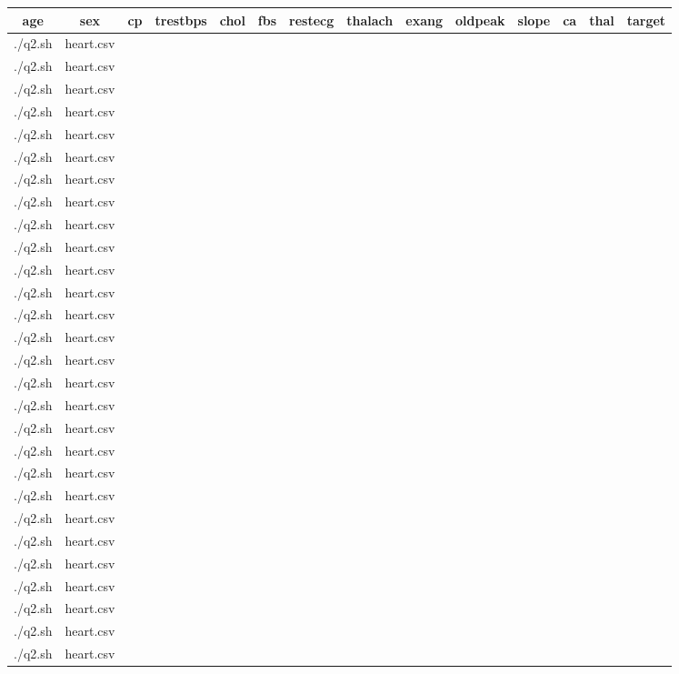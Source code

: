 \documentclass{article}
\begin{document}
\begin{table}[h!]
\centering
\begin{tabular}{|c|c|c|c|c|c|c|c|c|c|c|c|c|c|}
\hline
\textbf{age} & \textbf{sex} & \textbf{cp} & \textbf{trestbps} & \textbf{chol} & \textbf{fbs} & \textbf{restecg} & \textbf{thalach} & \textbf{exang} & \textbf{oldpeak} & \textbf{slope} & \textbf{ca} & \textbf{thal} & \textbf{target} \\ \hline./q2.sh & heart.csv &  &  &  &  &  &  &  &  &  &  &  &  \\ \hline./q2.sh & heart.csv &  &  &  &  &  &  &  &  &  &  &  &  \\ \hline./q2.sh & heart.csv &  &  &  &  &  &  &  &  &  &  &  &  \\ \hline./q2.sh & heart.csv &  &  &  &  &  &  &  &  &  &  &  &  \\ \hline./q2.sh & heart.csv &  &  &  &  &  &  &  &  &  &  &  &  \\ \hline./q2.sh & heart.csv &  &  &  &  &  &  &  &  &  &  &  &  \\ \hline./q2.sh & heart.csv &  &  &  &  &  &  &  &  &  &  &  &  \\ \hline./q2.sh & heart.csv &  &  &  &  &  &  &  &  &  &  &  &  \\ \hline./q2.sh & heart.csv &  &  &  &  &  &  &  &  &  &  &  &  \\ \hline./q2.sh & heart.csv &  &  &  &  &  &  &  &  &  &  &  &  \\ \hline./q2.sh & heart.csv &  &  &  &  &  &  &  &  &  &  &  &  \\ \hline./q2.sh & heart.csv &  &  &  &  &  &  &  &  &  &  &  &  \\ \hline./q2.sh & heart.csv &  &  &  &  &  &  &  &  &  &  &  &  \\ \hline./q2.sh & heart.csv &  &  &  &  &  &  &  &  &  &  &  &  \\ \hline./q2.sh & heart.csv &  &  &  &  &  &  &  &  &  &  &  &  \\ \hline./q2.sh & heart.csv &  &  &  &  &  &  &  &  &  &  &  &  \\ \hline./q2.sh & heart.csv &  &  &  &  &  &  &  &  &  &  &  &  \\ \hline./q2.sh & heart.csv &  &  &  &  &  &  &  &  &  &  &  &  \\ \hline./q2.sh & heart.csv &  &  &  &  &  &  &  &  &  &  &  &  \\ \hline./q2.sh & heart.csv &  &  &  &  &  &  &  &  &  &  &  &  \\ \hline./q2.sh & heart.csv &  &  &  &  &  &  &  &  &  &  &  &  \\ \hline./q2.sh & heart.csv &  &  &  &  &  &  &  &  &  &  &  &  \\ \hline./q2.sh & heart.csv &  &  &  &  &  &  &  &  &  &  &  &  \\ \hline./q2.sh & heart.csv &  &  &  &  &  &  &  &  &  &  &  &  \\ \hline./q2.sh & heart.csv &  &  &  &  &  &  &  &  &  &  &  &  \\ \hline./q2.sh & heart.csv &  &  &  &  &  &  &  &  &  &  &  &  \\ \hline./q2.sh & heart.csv &  &  &  &  &  &  &  &  &  &  &  &  \\ \hline./q2.sh & heart.csv &  
\end{tabular}
\end{table}
\end{document}
